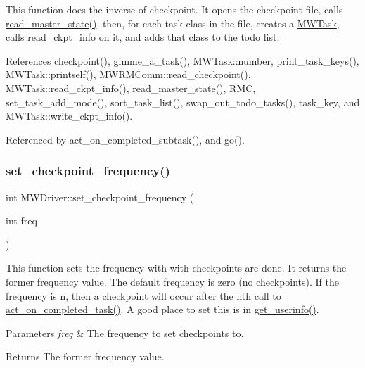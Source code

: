 This function does the inverse of checkpoint. It opens the checkpoint file, calls \hyperlink{classMWDriver_ab575d8dec66c8edadc165ebc6ea4e5a9}{read\+\_\+master\+\_\+state()}, then, for each task class in the file, creates a \hyperlink{classMWTask}{M\+W\+Task}, calls read\+\_\+ckpt\+\_\+info on it, and adds that class to the todo list. 

References checkpoint(), gimme\+\_\+a\+\_\+task(), M\+W\+Task\+::number, print\+\_\+task\+\_\+keys(), M\+W\+Task\+::printself(), M\+W\+R\+M\+Comm\+::read\+\_\+checkpoint(), M\+W\+Task\+::read\+\_\+ckpt\+\_\+info(), read\+\_\+master\+\_\+state(), R\+MC, set\+\_\+task\+\_\+add\+\_\+mode(), sort\+\_\+task\+\_\+list(), swap\+\_\+out\+\_\+todo\+\_\+tasks(), task\+\_\+key, and M\+W\+Task\+::write\+\_\+ckpt\+\_\+info().



Referenced by act\+\_\+on\+\_\+completed\+\_\+subtask(), and go().

\mbox{\label{classMWDriver_aa34fc54dfba3806db87c297c8b39244a}} 
\subsubsection{\texorpdfstring{set\+\_\+checkpoint\+\_\+frequency()}{set\_checkpoint\_frequency()}}
{\footnotesize\ttfamily int M\+W\+Driver\+::set\+\_\+checkpoint\+\_\+frequency (\begin{DoxyParamCaption}\item[{int}]{freq }\end{DoxyParamCaption})}

This function sets the frequency with with checkpoints are done. It returns the former frequency value. The default frequency is zero (no checkpoints). If the frequency is n, then a checkpoint will occur after the nth call to \hyperlink{classMWDriver_a920118e3f49ab81db5047d9ecdbcea2b}{act\+\_\+on\+\_\+completed\+\_\+task()}. A good place to set this is in \hyperlink{classMWDriver_acf0edc86b06b46968114c8bb770791b2}{get\+\_\+userinfo()}. 
\begin{DoxyParams}{Parameters}
{\em freq} & The frequency to set checkpoints to. \\
\hline
\end{DoxyParams}
\begin{DoxyReturn}{Returns}
The former frequency value. 
\end{DoxyReturn}


